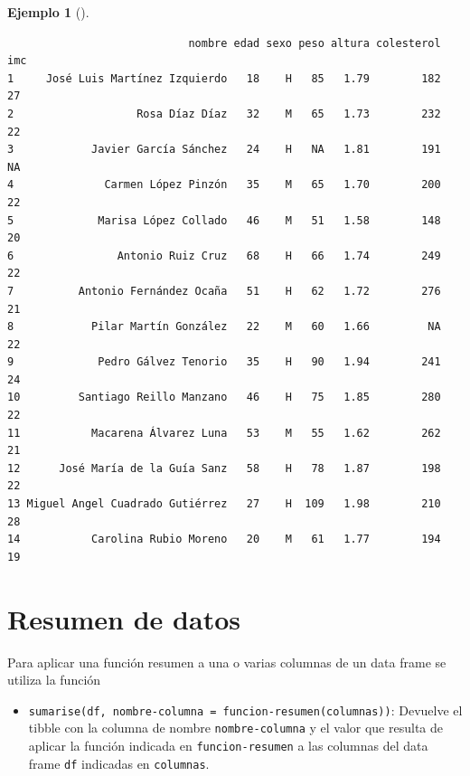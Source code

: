 \documentclass[
  spanish,
  a4paper,
]{scrreport}
\providecommand{\tightlist}{%
  \setlength{\itemsep}{0pt}\setlength{\parskip}{0pt}}
\theoremstyle{definition}
\theoremstyle{definition}
\newtheorem{example}{Ejemplo}[chapter]
\theoremstyle{remark}
\begin{document}
\begin{example}[]
\begin{verbatim}
                            nombre edad sexo peso altura colesterol imc
1     José Luis Martínez Izquierdo   18    H   85   1.79        182  27
2                   Rosa Díaz Díaz   32    M   65   1.73        232  22
3            Javier García Sánchez   24    H   NA   1.81        191  NA
4              Carmen López Pinzón   35    M   65   1.70        200  22
5             Marisa López Collado   46    M   51   1.58        148  20
6                Antonio Ruiz Cruz   68    H   66   1.74        249  22
7          Antonio Fernández Ocaña   51    H   62   1.72        276  21
8            Pilar Martín González   22    M   60   1.66         NA  22
9             Pedro Gálvez Tenorio   35    H   90   1.94        241  24
10         Santiago Reillo Manzano   46    H   75   1.85        280  22
11           Macarena Álvarez Luna   53    M   55   1.62        262  21
12      José María de la Guía Sanz   58    H   78   1.87        198  22
13 Miguel Angel Cuadrado Gutiérrez   27    H  109   1.98        210  28
14           Carolina Rubio Moreno   20    M   61   1.77        194  19
\end{verbatim}

\end{example}

\section{Resumen de datos}\label{resumen-de-datos}

Para aplicar una función resumen a una o varias columnas de un data
frame se utiliza la función

\begin{itemize}
\tightlist
\item
  \texttt{sumarise(df,\ nombre-columna\ =\ funcion-resumen(columnas))}:
  Devuelve el tibble con la columna de nombre \texttt{nombre-columna} y
  el valor que resulta de aplicar la función indicada en
  \texttt{funcion-resumen} a las columnas del data frame \texttt{df}
  indicadas en \texttt{columnas}.
\end{itemize}
\end{document}
